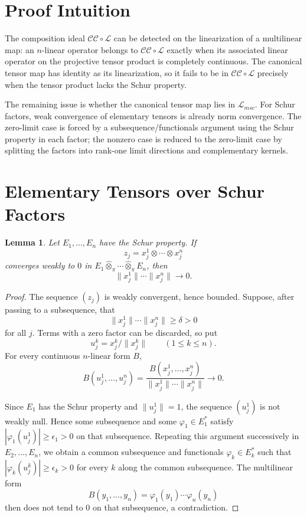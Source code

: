 \documentclass[11pt]{amsart}
\newtheorem{lemma}{Lemma}
\newcommand{\CC}{\mathcal{CC}}
\newcommand{\LLL}{\mathcal{L}}
\newcommand{\Lmsc}{\mathcal{L}_{msc}}
\newcommand{\tensorpi}{\widehat{\otimes}_{\pi}}
\begin{document}
\section*{Proof Intuition}

The composition ideal \(\CC\circ\LLL\) can be detected on the linearization of
a multilinear map: an \(n\)-linear operator belongs to \(\CC\circ\LLL\) exactly
when its associated linear operator on the projective tensor product is
completely continuous. The canonical tensor map has identity as its
linearization, so it fails to be in \(\CC\circ\LLL\) precisely when the tensor
product lacks the Schur property.

The remaining issue is whether the canonical tensor map lies in \(\Lmsc\).
For Schur factors, weak convergence of elementary tensors is already norm
convergence. The zero-limit case is forced by a subsequence/functionals
argument using the Schur property in each factor; the nonzero case is reduced
to the zero-limit case by splitting the factors into rank-one limit directions
and complementary kernels.

\section*{Elementary Tensors over Schur Factors}

\begin{lemma}\label{lem:zero}
Let \(E_1,\ldots,E_n\) have the Schur property. If
\[
  z_j=x_j^1\otimes\cdots\otimes x_j^n
\]
converges weakly to \(0\) in \(E_1\tensorpi\cdots\tensorpi E_n\), then
\[
  \|x_j^1\|\cdots\|x_j^n\|\longrightarrow 0.
\]
\end{lemma}

\begin{proof}
The sequence \((z_j)\) is weakly convergent, hence bounded. Suppose, after
passing to a subsequence, that
\[
  \|x_j^1\|\cdots\|x_j^n\|\geq \delta>0
\]
for all \(j\). Terms with a zero factor can be discarded, so put
\[
  u_j^k=x_j^k/\|x_j^k\| \qquad (1\leq k\leq n).
\]
For every continuous \(n\)-linear form \(B\),
\[
  B(u_j^1,\ldots,u_j^n)
  =
  \frac{B(x_j^1,\ldots,x_j^n)}
       {\|x_j^1\|\cdots\|x_j^n\|}
  \longrightarrow 0.
\]

Since \(E_1\) has the Schur property and \(\|u_j^1\|=1\), the sequence
\((u_j^1)\) is not weakly null. Hence some subsequence and some
\(\varphi_1\in E_1^*\) satisfy \(|\varphi_1(u_j^1)|\geq \epsilon_1>0\) on
that subsequence. Repeating this argument successively in \(E_2,\ldots,E_n\),
we obtain a common subsequence and functionals \(\varphi_k\in E_k^*\) such
that \(|\varphi_k(u_j^k)|\geq \epsilon_k>0\) for every \(k\) along the common
subsequence. The multilinear form
\[
  B(y_1,\ldots,y_n)=\varphi_1(y_1)\cdots\varphi_n(y_n)
\]
then does not tend to \(0\) on that subsequence, a contradiction.
\end{proof}
\end{document}

